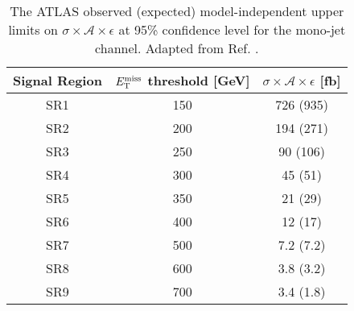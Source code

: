 \begin{table}[!htbp]
\centering
\begin{tabular}{c|c|c}
 \hline
 \hline
 Signal Region & $E_{\mathrm{T}}^{\mathrm{miss}}$ threshold [GeV] & $\sigma \times \mathcal{A} \times \epsilon$ [fb] \\ %
 \hline
 SR1 & 150 & 726 (935) \\ %
 SR2 & 200 & 194 (271) \\ %
 SR3 & 250 & 90 (106) \\ %
 SR4 & 300 & 45 (51) \\ %
 SR5 & 350 & 21 (29) \\ %
 SR6 & 400 & 12 (17) \\ %
 SR7 & 500 & 7.2 (7.2) \\ %
 SR8 & 600 & 3.8 (3.2) \\ %
 SR9 & 700 & 3.4 (1.8) \\ %
 \hline
 \hline
\end{tabular}
\caption{The ATLAS observed (expected) model-independent upper limits on $\sigma \times \mathcal{A} \times \epsilon$ at 95\% confidence level for the mono-jet channel. Adapted from Ref. \cite{Aad:2015zva}.
}
\label{monojet_SRs}
\end{table}

